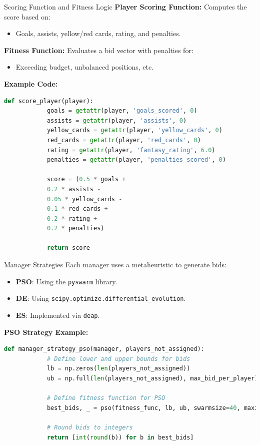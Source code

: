\documentclass{beamer}
\begin{document}
	\begin{frame}[fragile]{Scoring Function and Fitness Logic}
		\textbf{Player Scoring Function:} Computes the score based on:
		\begin{itemize}
			\item Goals, assists, yellow/red cards, rating, and penalties.
		\end{itemize}
		\vspace{0.5em}
		\textbf{Fitness Function:} Evaluates a bid vector with penalties for:
		\begin{itemize}
			\item Exceeding budget, unbalanced positions, etc.
		\end{itemize}
		\vspace{0.5em}
		\textbf{Example Code:}
		\begin{lstlisting}[language=Python, caption=score_player in utils.py]
			def score_player(player):
			goals = getattr(player, 'goals_scored', 0)
			assists = getattr(player, 'assists', 0)
			yellow_cards = getattr(player, 'yellow_cards', 0)
			red_cards = getattr(player, 'red_cards', 0)
			rating = getattr(player, 'fantasy_rating', 6.0)
			penalties = getattr(player, 'penalties_scored', 0)
			
			score = (0.5 * goals +
			0.2 * assists -
			0.05 * yellow_cards -
			0.1 * red_cards +
			0.2 * rating +
			0.2 * penalties)
			
			return score
		\end{lstlisting}
	\end{frame}
	
	\begin{frame}[fragile]{Manager Strategies}
		Each manager uses a metaheuristic to generate bids:
		\begin{itemize}
			\item \textbf{PSO}: Using the \texttt{pyswarm} library.
			\item \textbf{DE}: Using \texttt{scipy.optimize.differential\_evolution}.
			\item \textbf{ES}: Implemented via \texttt{deap}.
		\end{itemize}
		\vspace{0.5em}
		\textbf{PSO Strategy Example:}
		\begin{lstlisting}[language=Python, caption=manager_strategy_pso]
			def manager_strategy_pso(manager, players_not_assigned):
			# Define lower and upper bounds for bids
			lb = np.zeros(len(players_not_assigned))
			ub = np.full(len(players_not_assigned), max_bid_per_player)
			
			# Define fitness function for PSO
			best_bids, _ = pso(fitness_func, lb, ub, swarmsize=40, maxiter=80)
			
			# Round bids to integers
			return [int(round(b)) for b in best_bids]
		\end{lstlisting}
	\end{frame}
	
\end{document}
